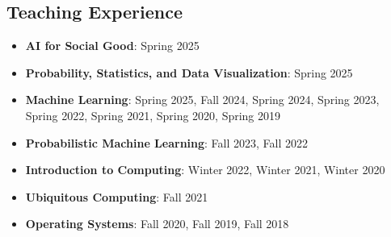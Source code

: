 \documentclass[letter,10pt]{article}
\begin{document}
\subsection*{\textbf{Teaching Experience}}
\vspace{-0.4em}
\begin{itemize}
\item[] \textbf{AI for Social Good}: Spring 2025
\item[] \textbf{Probability, Statistics, and Data Visualization}: Spring 2025
\item[] \textbf{Machine Learning}: Spring 2025, Fall 2024, Spring 2024, Spring 2023, Spring 2022, Spring 2021, Spring 2020, Spring 2019
\item[] \textbf{Probabilistic Machine Learning}: Fall 2023, Fall 2022
\item[] \textbf{Introduction to Computing}: Winter 2022, Winter 2021, Winter 2020
\item[] \textbf{Ubiquitous Computing}: Fall 2021
\item[] \textbf{Operating Systems}: Fall 2020, Fall 2019, Fall 2018
  

\end{itemize}
\end{document}

